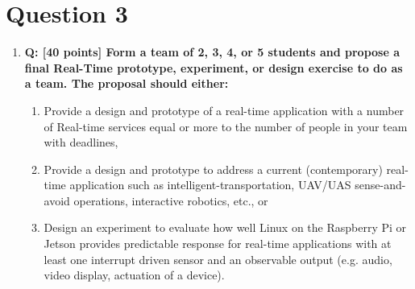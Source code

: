 \documentclass[a4paper,11pt]{article}%
\newenvironment{qanda}{\setlength{\parindent}{0pt}}{\bigskip}
\newcommand{\Q}{\bigskip\bfseries Q: }
\begin{document}
\begin{qanda}
	\section{Question 3}
	\begin{enumerate}
		\item[] \Q [40 points] Form a team of 2, 3, 4, or 5 students and propose a final Real-Time prototype,
			experiment, or design exercise to do as a team. The proposal should either:
			\begin{enumerate}
				\item Provide a design and prototype of a real-time application with a number of Real-time
				      services equal or more to the number of people in your team with deadlines,
				\item Provide a design and prototype to address a current (contemporary) real-time
				      application such as intelligent-transportation, UAV/UAS sense-and-avoid operations,
				      interactive robotics, etc., or
				\item Design an experiment to evaluate how well Linux on the Raspberry Pi or Jetson
				      provides predictable response for real-time applications with at least one interrupt driven
				      sensor and an observable output (e.g. audio, video display, actuation of a device).
			\end{enumerate}


\end{enumerate}
\end{qanda}
\end{document}
